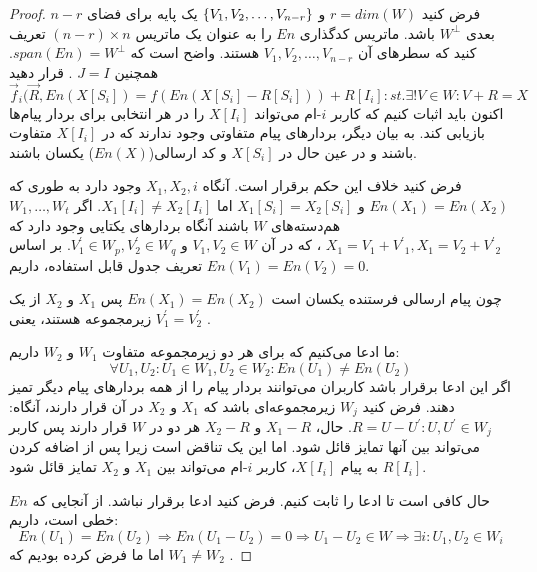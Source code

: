 \begin{proof}
    فرض کنید 
    $r = dim(W)$
     و 
     $\left\{ V_1, V_2, \ldots, V_{n - r}  \right\}$
     یک پایه برای فضای
      $n - r$
       بعدی 
      $W^\bot$
       باشد. ماتریس کدگذاری 
      $En$
       را به عنوان یک ماتریس 
     $(n - r) \times n $
      تعریف کنید که سطرهای آن 
      $V_1, V_2, \ldots, V_{n - r}$
       هستند. واضح است که 
      $span(En) = W^\bot$.
       همچنین 
       $J = I$ 
       . قرار دهید
       $$\overrightarrow{f}_i(\overrightarrow{R}, En(X[S_i]) = f(En(X[S_i] - R[S_i])) + R[I_i]: st.\exists! V \in W: V + R = X $$
      اکنون باید اثبات کنیم که کاربر $i$-ام می‌تواند $X[I_i]$ را در هر انتخابی برای بردار پیام‌ها بازیابی کند. به بیان دیگر، بردارهای پیام متفاوتی وجود ندارند که در 
    $X[I_i]$‌
    متفاوت باشند و در عین حال در
    $X[S_i]$
      و کد ارسالی($En(X)$) یکسان باشند.
       
       فرض کنید خلاف این حکم برقرار است. آنگاه 
     $X_1, X_2, i$
      وجود دارد به طوری که 
     $En(X_1) = En(X_2)$
      و 
     $X_1[S_i] = X_2[S_i]$
      اما 
     $X_1[I_i] \neq X_2[I_i]$.
     اگر 
     $W_1, \ldots, W_t$
      هم‌دسته‌های 
     $W$
      باشند آنگاه بردارهای یکتایی وجود دارد که 
     $X_1 = V_1 + {V^\prime}_1, X_1 = V_2 + {V^\prime}_2$
     ، که در آن 
     $V_1, V_2 \in W$
      و 
      $V^\prime_1 \in W_p, V^\prime_2 \in W_q$.
    بر اساس تعریف جدول قابل استفاده، داریم
     $En(V_1) = En(V_2) = 0$.
    
    چون پیام ارسالی فرستنده یکسان است
    $En(X_1) = En(X_2)$
    پس
    $X_1$ و $X_2$
     از یک زیرمجموعه هستند، یعنی 
    $V^\prime_1 = V^\prime_2$
    .
    
    ما ادعا می‌کنیم که برای هر دو زیرمجموعه متفاوت 
    $W_1$ و $W_2$
     داریم: 
    $$\forall U_1, U_2: U_1 \in W_1, U_2 \in W_2: En(U_1) \neq En(U_2)$$
    اگر این ادعا برقرار باشد کاربران می‌توانند بردار پیام را از همه بردارهای پیام دیگر تمیز دهند. فرض کنید 
    $W_j$ 
    زیرمجموعه‌ای باشد که 
    $X_1$ و $X_2$
     در آن قرار دارند، آنگاه: 
     $R = U - U^\prime: U, U^\prime \in W_j$. 
     حال، 
     $X_1 - R$ و $X_2 - R$ 
     هر دو در 
     $W$
      قرار دارند پس کاربر می‌تواند بین آنها تمایز قائل شود. اما این یک تناقض است زیرا پس از اضافه کردن 
     $R[I_i]$
      به پیام 
     $X[I_i]$،
     کاربر 
     $i$-ام
      می‌تواند بین 
      $X_1$ و $X_2$ 
      تمایز قائل شود.
     
    حال کافی است تا ادعا را ثابت کنیم. فرض کنید ادعا برقرار نباشد. از آنجایی که $En$ خطی است، داریم: 
    $$En(U_1) = En(U_2) \Rightarrow En(U_1 - U_2) = 0 \Rightarrow U_1 - U_2 \in W \Rightarrow \exists i: U_1, U_2 \in W_i$$
    اما ما فرض کرده بودیم که
     $W_1 \neq W_2$
     .
\end{proof}

